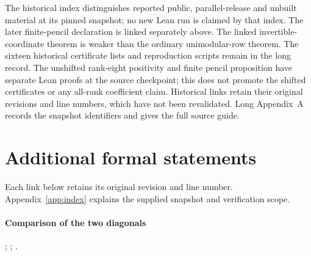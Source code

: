 \documentclass[11pt]{article}
\begin{document}
The historical index distinguishes reported public, parallel-release and
unbuilt material at its pinned snapshot; no new Lean run is claimed by that
index. The later finite-pencil declaration is linked separately above.
The linked invertible-coordinate
theorem is weaker than the ordinary unimodular-row theorem.
The sixteen historical certificate lists and reproduction scripts remain
in the long record. The unshifted rank-eight positivity and finite pencil
proposition have separate Lean proofs at the source checkpoint; this does not
promote the shifted certificates or any all-rank coefficient claim.
Historical links retain their original revisions and line numbers,
which have not been revalidated. Long Appendix~A records the snapshot
identifiers and gives the full source guide.
\par\endgroup


\section{Additional formal statements}
\label{sec:pinned-lean-sources}
Each link below retains its original revision and line number.
Appendix~\ref{app:index} explains the supplied snapshot and verification scope.

\paragraph{Comparison of the two diagonals}
;
;
.
\end{document}
